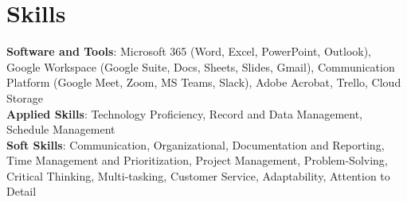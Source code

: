 \documentclass[letterpaper,11pt]{article}
\begin{document}
\section{Skills}
\begin{itemize}[leftmargin=0.15in, label={}]
\small{\item{\textbf{Software and Tools}{: Microsoft 365 (Word, Excel, PowerPoint, Outlook), Google Workspace (Google Suite, Docs, Sheets, Slides, Gmail), Communication Platform (Google Meet, Zoom, MS Teams, Slack), Adobe Acrobat, Trello, Cloud Storage} \\
\textbf{Applied Skills}{: Technology Proficiency, Record and Data Management, Schedule Management} \\
\textbf{Soft Skills}{: Communication, Organizational, Documentation and Reporting, Time Management and Prioritization, Project Management, Problem-Solving, Critical Thinking, Multi-tasking, Customer Service, Adaptability, Attention to Detail} }}
\end{itemize}


\end{document}
